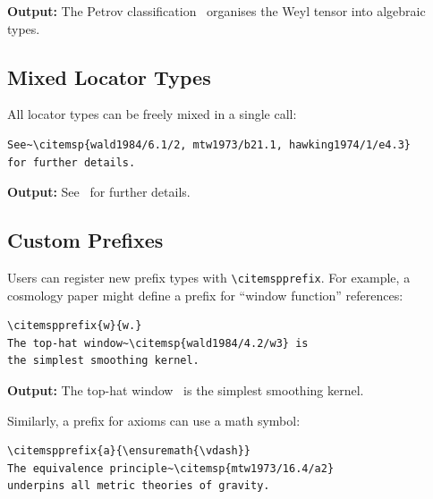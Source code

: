 \documentclass[11pt, a4paper]{article}
\begin{document}
\noindent\textbf{Output:} The Petrov classification~ organises the Weyl tensor into algebraic types.


\subsection{Mixed Locator Types}

All locator types can be freely mixed in a single call:

\begin{tcolorbox}[colback=blue!3, colframe=blue!30, boxrule=0.5pt, arc=2pt, top=6pt, bottom=6pt, left=10pt, right=10pt]
\begin{verbatim}
See~\citemsp{wald1984/6.1/2, mtw1973/b21.1, hawking1974/1/e4.3}
for further details.
\end{verbatim}
\end{tcolorbox}

\noindent\textbf{Output:} See~ for further details.


\subsection{Custom Prefixes}

Users can register new prefix types with \texttt{\textbackslash citemspprefix}. For example, a cosmology paper might define a prefix for ``window function'' references:


\begin{tcolorbox}[colback=blue!3, colframe=blue!30, boxrule=0.5pt, arc=2pt, top=6pt, bottom=6pt, left=10pt, right=10pt]
\begin{verbatim}
\citemspprefix{w}{w.}
The top-hat window~\citemsp{wald1984/4.2/w3} is
the simplest smoothing kernel.
\end{verbatim}
\end{tcolorbox}

\noindent\textbf{Output:} The top-hat window~ is the simplest smoothing kernel.

\medskip
\noindent Similarly, a prefix for axioms can use a math symbol:


\begin{tcolorbox}[colback=blue!3, colframe=blue!30, boxrule=0.5pt, arc=2pt, top=6pt, bottom=6pt, left=10pt, right=10pt]
\begin{verbatim}
\citemspprefix{a}{\ensuremath{\vdash}}
The equivalence principle~\citemsp{mtw1973/16.4/a2}
underpins all metric theories of gravity.
\end{verbatim}
\end{tcolorbox}
\end{document}
